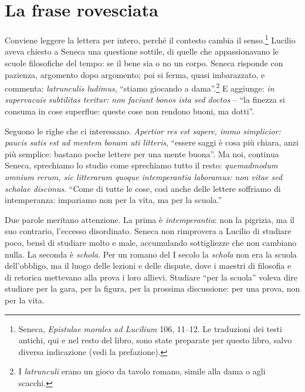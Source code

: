 \section{La frase rovesciata}

Conviene leggere la lettera per intero, perché il contesto cambia il
senso.\footnote{Seneca, \emph{Epistulae morales ad Lucilium} 106,
11--12. Le traduzioni dei testi antichi, qui e nel resto del libro,
sono state preparate per questo libro, salvo diversa indicazione (vedi
la prefazione).} Lucilio aveva chiesto a
Seneca una questione sottile, di quelle che appassionavano le scuole
filosofiche del tempo: se il bene sia o no un corpo. Seneca risponde con
pazienza, argomento dopo argomento; poi si ferma, quasi imbarazzato, e
commenta: \emph{latrunculis ludimus}, \enquote{stiamo giocando a
dama}.\footnote{I \emph{latrunculi} erano un gioco da tavolo romano,
simile alla dama o agli scacchi.} E aggiunge: \emph{in supervacuis
subtilitas teritur: non faciunt bonos ista sed doctos} -- \enquote{la
finezza si consuma in cose superflue: queste cose non rendono buoni,
ma dotti}.

Seguono le righe che ci interessano. \emph{Apertior res est sapere,
immo simplicior: paucis satis est ad mentem bonam uti litteris},
\enquote{essere saggi è cosa più chiara, anzi più semplice: bastano
poche lettere per una mente buona}. Ma noi, continua Seneca, sprechiamo
lo studio come sprechiamo tutto il resto: \emph{quemadmodum omnium
rerum, sic litterarum quoque intemperantia laboramus: non vitae sed
scholae discimus}. \enquote{Come di tutte le cose, così anche delle
lettere soffriamo di intemperanza: impariamo non per la vita, ma per la
scuola.}

Due parole meritano attenzione. La prima è \emph{intemperantia}: non
la pigrizia, ma il suo contrario, l'eccesso disordinato. Seneca non
rimprovera a Lucilio di studiare poco, bensì di studiare molto e male,
accumulando sottigliezze che non cambiano nulla. La seconda è
\emph{schola}. Per un romano del I secolo la \emph{schola} non era la
scuola dell'obbligo, ma il luogo delle lezioni e delle dispute, dove i
maestri di filosofia e di retorica mettevano alla prova i loro allievi.
Studiare \enquote{per la scuola} voleva dire studiare per la gara, per
la figura, per la prossima discussione: per una prova, non per la vita.

